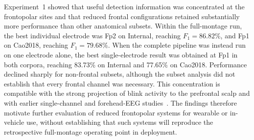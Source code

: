 Experiment~1 showed that useful detection information was concentrated at the frontopolar sites and that reduced frontal configurations retained substantially more performance than other anatomical subsets. Within the full-montage run, the best individual electrode was Fp2 on Internal, reaching $F_1=86.82\%$, and Fp1 on Cao2018, reaching $F_1=79.68\%$. When the complete pipeline was instead run on one electrode alone, the best single-electrode result was obtained at Fp1 in both corpora, reaching 83.73\% on Internal and 77.65\% on Cao2018. Performance declined sharply for non-frontal subsets, although the subset analysis did not establish that every frontal channel was necessary. This concentration is compatible with the strong projection of blink activity to the prefrontal scalp and with earlier single-channel and forehead-EEG studies~\citep{chang2016detection,ko2020eyeblink,zhang2023method,tran2021detection,valderrama2018automatic,wang2025sliding,shahbakhti2022simultaneous,aoki2023drowsiness,lopezahumada2023hardware}. The findings therefore motivate further evaluation of reduced frontopolar systems for wearable or in-vehicle use, without establishing that such systems will reproduce the retrospective full-montage operating point in deployment.
